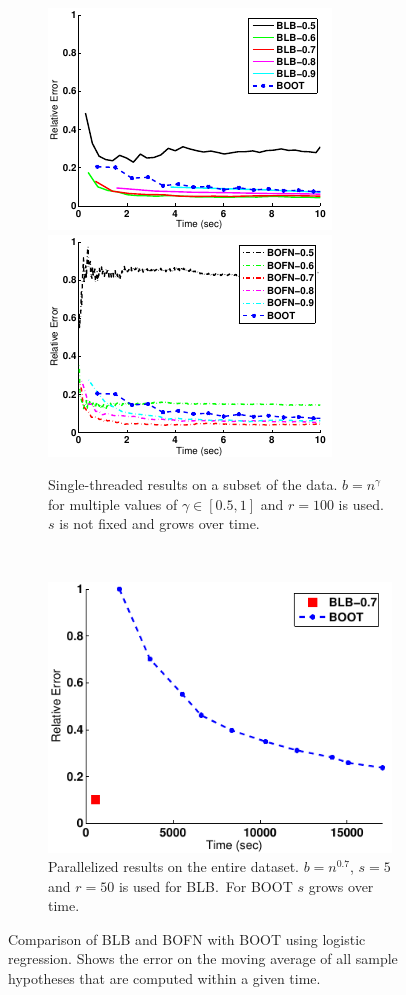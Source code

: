 \begin{figure}
	\begin{subfigure}[t]{0.66\textwidth}
		\centering
		\includegraphics[width=0.49\linewidth]{gfx/blb/time1.pdf}
		\includegraphics[width=0.49\linewidth]{gfx/blb/time2.pdf}
		\caption{
			Single-threaded results on a subset of the data.
			\(b = n^\gamma\) for multiple values of \(\gamma \in [0.5, 1]\) and \(r = 100\) is used.
			\(s\) is not fixed and grows over time.
		}\label{fig:blb:eval:single}
	\end{subfigure}
	\hfill\
	\begin{subfigure}[t]{0.32\textwidth}
		\centering
		\includegraphics[width=\linewidth]{gfx/blb/parallel.pdf}
		\caption{
			Parallelized results on the entire dataset.
			\(b = n^{0.7}\), \(s = 5\) and \(r = 50\) is used for BLB.\
			For BOOT \(s\) grows over time.
		}\label{fig:blb:eval:parallel}
	\end{subfigure}
	\caption{
		Comparison of BLB and BOFN with BOOT using logistic regression.
		Shows the error on the moving average of all sample hypotheses that are computed within a given time.
	}\label{fig:blb:eval}
\end{figure}

